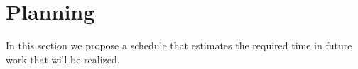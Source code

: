 \section{Planning}
\label{sec:Planning}
In this section we propose a schedule that estimates the required time in future work that will be realized.\\
